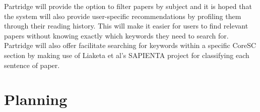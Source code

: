 \documentclass[12pt,a4paper]{article}
\begin{document}
Partridge will provide the option to filter papers by subject and it is hoped
that the system will also provide user-specific recommendations by profiling
them through their reading history. This will make it easier for users to find
relevant papers without knowing exactly which keywords they need to search for.
Partridge will also offer facilitate searching for keywords within a specific
CoreSC section by making use of Liaketa et al's SAPIENTA project for
classifying each sentence of paper. 


\section{Planning}

\pagebreak


\end{document}
